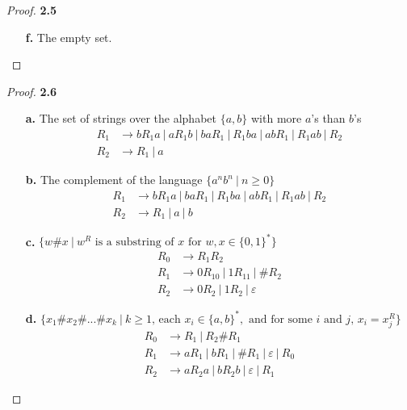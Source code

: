 \documentclass[11pt]{article}
\theoremstyle{definition}
\begin{document}
\begin{proof}{\textbf{2.5}}
\begin{itemize}
\begin{figure}[H]
    \end{figure}
    \item [\textbf{f.}] The empty set.
    \begin{figure}[H]
        \centering
    \end{figure}
\end{itemize}
\end{proof}    
\cleardoublepage
\begin{proof}{\textbf{2.6}}
    \begin{itemize}
        \item [\textbf{a.}]
        The set of strings over the alphabet $\{a,b\}$ with more $a$'s than
        $b$'s
        \begin{align*}
            R_1 &\to bR_1a~|~aR_1b~|~baR_1~|~R_1ba~|~abR_1~|~R_1ab~|~R_2\\
            R_2 &\to R_1~|~a
        \end{align*}
        \item [\textbf{b.}]
        The complement of the language $\{a^nb^n~|~n\geq 0\}$
        \begin{align*}
            R_1 &\to bR_1a~|~baR_1~|~R_1ba~|~abR_1~|~R_1ab~|~R_2\\
            R_2 &\to R_1~|~a~|~b
        \end{align*}
        \item [\textbf{c.}]
        $\{w \# x~|~ w^R \text{ is a substring of $x$ for $w$}, x\in \{0,1\}^*\}$
        \begin{align*}
            R_0 &\to R_1R_2\\
            R_1 &\to 0R_10~|~1R_11~|~\# R_2\\
            R_2 &\to 0R_2~|~1R_2~|~\varepsilon
        \end{align*}
        \item [\textbf{d.}]
        $\{x_1 \# x_2\#...\# x_k ~|~ k \geq 1 \text{, each }x_i \in \{a,b\}^*,
        \text{ and for some $i$ and $j$, }x_i = x_j^R\}$
        \begin{align*}
            R_0 &\to R_1~|~R_2\#R_1\\
            R_1 &\to aR_1~|~bR_1~|~\#R_1~|~\varepsilon~|~R_0\\
            R_2 &\to aR_2a~|~bR_2b~|~\varepsilon~|~R_1
        \end{align*}
    \end{itemize}
\end{proof}
\end{document}
